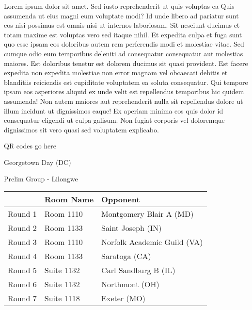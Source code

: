 \documentclass{article}%
\begin{document}
\vspace*{8pt}%
\linebreak%
\newline%
\newline%
Lorem ipsum dolor sit amet. Sed iusto reprehenderit ut quis voluptas ea Quis assumenda ut eius magni eum voluptate modi? Id unde libero ad pariatur sunt eos nisi possimus est omnis nisi ut internos laboriosam. Sit nesciunt ducimus et totam maxime est voluptas vero sed itaque nihil. Et expedita culpa et fuga sunt quo esse ipsam eos doloribus autem rem perferendis modi et molestiae vitae.\newline%
\newline%
Sed cumque odio eum temporibus deleniti ad consequatur consequatur aut molestias maiores. Est doloribus tenetur est dolorem ducimus sit quasi provident. Est facere expedita non expedita molestiae non error magnam vel obcaecati debitis et blanditiis reiciendis est cupiditate voluptatem ea soluta consequatur. Qui tempore ipsam eos asperiores aliquid ex unde velit est repellendus temporibus hic quidem assumenda!\newline%
\newline%
Non autem maiores aut reprehenderit nulla sit repellendus dolore ut illum incidunt ut dignissimos eaque! Ex aperiam minima eos quis dolor id consequatur eligendi ut culpa galisum. Non fugiat corporis vel doloremque dignissimos sit vero quasi sed voluptatem explicabo.\newline%
\newline%
%
\vspace*{30pt}%
\begin{center}%
\begin{Huge}%
QR codes go here%
\end{Huge}%
\end{center}%
\newpage%
%
\begin{center}%
\begin{Huge}%
Georgetown Day (DC)%
\end{Huge}%
\vspace*{8pt}%
\linebreak%
\begin{Large}%
Prelim Group {-} Lilongwe%
\end{Large}%
\end{center}%
\begin{tabularx}{\textwidth}{|c|Y|Y|}%
\hline%
&Room Name&Opponent\\%
\hline%
Round 1&Room 1110&Montgomery Blair A (MD)\\%
Round 2&Room 1133&Saint Joseph (IN)\\%
Round 3&Room 1110&Norfolk Academic Guild (VA)\\%
Round 4&Room 1133&Saratoga (CA)\\%
Round 5&Suite 1132&Carl Sandburg B (IL)\\%
Round 6&Suite 1132&Northmont (OH)\\%
Round 7&Suite 1118&Exeter (MO)\\%
\hline%
\end{tabularx}%
\end{document}
